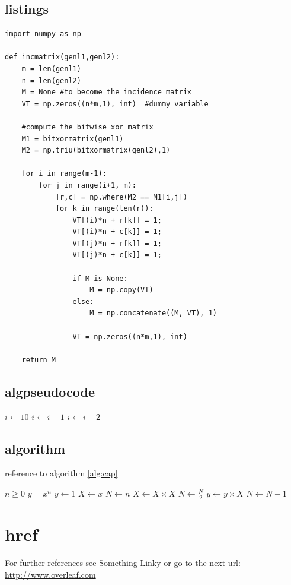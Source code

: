 \documentclass[../main.tex]{subfiles}
\begin{document}
\subsection{listings}
\begin{lstlisting}
import numpy as np
    
def incmatrix(genl1,genl2):
    m = len(genl1)
    n = len(genl2)
    M = None #to become the incidence matrix
    VT = np.zeros((n*m,1), int)  #dummy variable
    
    #compute the bitwise xor matrix
    M1 = bitxormatrix(genl1)
    M2 = np.triu(bitxormatrix(genl2),1) 

    for i in range(m-1):
        for j in range(i+1, m):
            [r,c] = np.where(M2 == M1[i,j])
            for k in range(len(r)):
                VT[(i)*n + r[k]] = 1;
                VT[(i)*n + c[k]] = 1;
                VT[(j)*n + r[k]] = 1;
                VT[(j)*n + c[k]] = 1;
                
                if M is None:
                    M = np.copy(VT)
                else:
                    M = np.concatenate((M, VT), 1)
                
                VT = np.zeros((n*m,1), int)
    
    return M
\end{lstlisting}

\subsection{algpseudocode}
\begin{algorithmic}
\State $i \gets 10$
    \State $i \gets i-1$
\Else
        \State $i \gets i+2$
    \EndIf
\EndIf 
\end{algorithmic}

\subsection{algorithm}

reference to algorithm \ref{alg:cap}
\begin{algorithm}[!h]
\caption{An algorithm with caption}\label{alg:cap}
\begin{algorithmic}
\Require $n \geq 0$
\Ensure $y = x^n$
\State $y \gets 1$
\State $X \gets x$
\State $N \gets n$
    \State $X \gets X \times X$
    \State $N \gets \frac{N}{2}$  
    \State $y \gets y \times X$
    \State $N \gets N - 1$
\EndIf
\EndWhile
\end{algorithmic}
\end{algorithm}

\section{href}
For further references see \href{http://www.overleaf.com}{Something Linky} 
or go to the next url: \url{http://www.overleaf.com}
\end{document}
